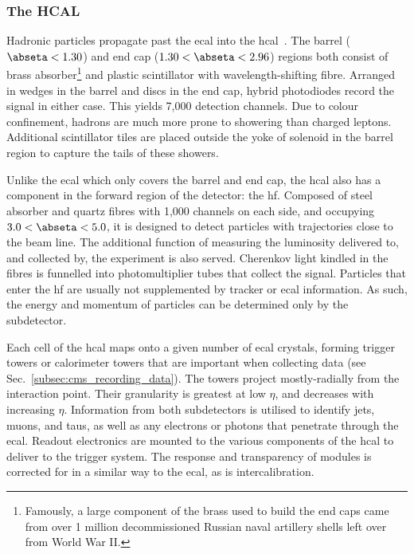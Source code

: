 



\subsubsection{The HCAL}
\label{subsubsec:cms_hcal}

Hadronic particles propagate past the \acrshort{ecal} into the \acrshort{hcal}~\cite{CERN-LHCC-97-031}. The barrel ($\abseta < \text{1.30}$) and end cap ($\text{1.30} < \abseta < \text{2.96}$) regions both consist of brass absorber\footnote{Famously, a large component of the brass used to build the end caps came from over 1 million decommissioned Russian naval artillery shells left over from World War II.} and plastic scintillator with wavelength-shifting fibre. Arranged in wedges in the barrel and discs in the end cap, hybrid photodiodes record the signal in either case. This yields 7,000 detection channels. Due to colour confinement, hadrons are much more prone to showering than charged leptons. Additional scintillator tiles are placed outside the yoke of solenoid in the barrel region to capture the tails of these showers.

Unlike the \acrshort{ecal} which only covers the barrel and end cap, the \acrshort{hcal} also has a component in the forward region of the detector: the \acrfull{hf}. Composed of steel absorber and quartz fibres with 1,000 channels on each side, and occupying $\text{3.0} < \abseta < \text{5.0}$, it is designed to detect particles with trajectories close to the beam line. The additional function of measuring the luminosity delivered to, and collected by, the experiment is also served. Cherenkov light kindled in the fibres is funnelled into photomultiplier tubes that collect the signal. Particles that enter the \acrshort{hf} are usually not supplemented by tracker or \acrshort{ecal} information. As such, the energy and momentum of particles can be determined only by the subdetector.

Each cell of the \acrshort{hcal} maps onto a given number of \acrshort{ecal} crystals, forming trigger towers or calorimeter towers that are important when collecting data (see Sec.~\ref{subsec:cms_recording_data}). The towers project mostly-radially from the interaction point. Their granularity is greatest at low $\eta$, and decreases with increasing $\eta$. Information from both subdetectors is utilised to identify \glspl{jet}, muons, and taus, as well as any electrons or photons that penetrate through the \acrshort{ecal}. Readout electronics are mounted to the various components of the \acrshort{hcal} to deliver to the trigger system. The response and transparency of modules is corrected for in a similar way to the \acrshort{ecal}, as is intercalibration.

